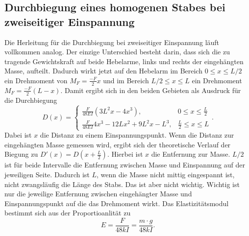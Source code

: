 \subsection{Durchbiegung eines homogenen Stabes bei zweiseitiger Einspannung}
Die Herleitung für die Durchbiegung bei zweiseitiger Einspannung läuft vollkommen analog.
Der einzige Unterschied besteht darin, dass sich die zu tragende Gewichtskraft auf beide Hebelarme, links und rechts der eingehängten Masse, aufteilt.
Dadurch wirkt jetzt auf den Hebelarm im Bereich $0\leq x \leq L/2 $ ein Drehmoment von $M_F=\frac{-F}{2}x$ 
und im Bereich $L/2\leq x \leq L $ ein Drehmoment $M_F=\frac{-F}{2}(L-x)$.
Damit ergibt sich in den beiden Gebieten als Ausdruck für die Durchbiegung
\begin{equation}
    D(x)=
    \begin{cases}
        \frac{F}{48EI}(3L^2x-4x^3), & 0\leq x\leq\frac{L}{2}\\
        \frac{F}{48EI}{4x^3-12Lx^2+9L^2x-L^3}, & \frac{L}{2}\leq x\leq L
        \label{Biegung2}
    \end{cases}
    \text{.}
\end{equation}
Dabei ist $x$ die Distanz zu einem Einspannungspunkt. Wenn die Distanz zur eingehängten Masse gemessen wird,
ergibt sich der theoretische Verlauf der Biegung zu $D'(x)=D(x+\frac{L}{2})$. Hierbei ist $x$ die Entfernung zur Masse.
$L/2$ ist für beide Intervalle die Entfernung zwischen Masse und Einspannung auf der jeweiligen Seite. Dadurch ist $L$, wenn die Masse
nicht mittig eingespannt ist, nicht zwangsläufig die Länge des Stabs. Das ist aber nicht wichtig. Wichtig ist nur die jeweilige Entfernung zwischen
eingehängter Masse und Einspannungspunkt auf die das Drehmoment wirkt. Das Elastizitätsmodul bestimmt sich aus der Proportioanlität zu 
\begin{equation}
    E=\frac{F}{48kI}=\frac{m\cdot g}{48kI} \text{.}
    \label{eq:2Konstante}
\end{equation}
\cite{V103}
